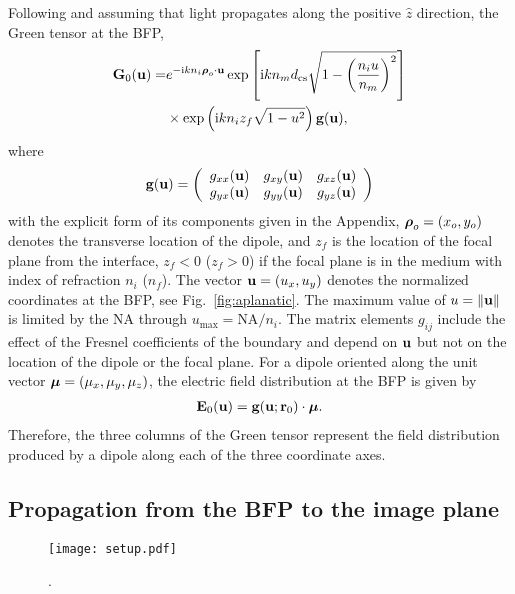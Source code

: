 \documentclass[reprint,aps,pra,superscriptaddress,
amsmath,amssymb]{revtex4-1}
\begin{document}
Following \cite{lieb2004single,novotny2006principles} and assuming that 
light propagates along the positive $\hat z$ direction, the Green tensor 
at the BFP,
\begin{align} \label{eq:G0}
\textbf G_0 (\textbf u) = &   e^{-\text{i} k n_i \boldsymbol \rho_o \cdot \textbf u } 
\exp \left[\text{i} k n_m d_\text{cs} 
\sqrt{1 - \left(\frac{n_i u}{n_m} \right)^2 } \right]  \nonumber \\
& \times \exp \left(\text{i} k n_i z_f \sqrt{1 - u^2} \right) \textbf g (\textbf u) ,
\end{align}
where 
\begin{align}
\textbf g (\textbf u) =
\left(
\begin{array}{ccc}
g_{xx}  (\textbf u)& g_{xy}  (\textbf u)& g_{xz}  (\textbf u) \\
g_{yx}  (\textbf u)& g_{yy}  (\textbf u)& g_{yz} (\textbf u)
\end{array}
\right)
\end{align}
with the explicit form of  its components given in the Appendix,
$\boldsymbol \rho_o =(x_o,y_o)$  denotes the transverse location of the dipole, 
and 
$z_f$ is the location of the focal plane from the interface, $z_f<0$ 
($z_f>0$) if the focal plane is in the medium with index of refraction 
$n_i$ ($n_f$). The vector 
$\textbf u = (u_x, u_y)$ denotes the normalized coordinates at the BFP, 
see Fig.~\ref{fig:aplanatic}. The maximum value of $u = \left\lVert\textbf u\right\rVert$ is 
limited by the NA through $u_\text{max} = \text{NA}/n_i$. 
The matrix elements $g_{ij}$ include the effect of the Fresnel coefficients 
of the boundary and depend on $\textbf u$ but not on the location of the dipole 
or the focal plane.  For a dipole oriented along the unit vector 
$\boldsymbol \mu = (\mu_x, \mu_y, \mu_z)$, the electric field distribution at the BFP 
is given by 
\begin{align}
\textbf E_{0} (\textbf u) = \textbf g (\textbf u; \textbf r_0) \cdot \boldsymbol \mu.
\end{align}
Therefore, the three columns of the Green tensor represent the field 
distribution produced by a dipole along each of the three coordinate axes. 


\subsection{Propagation from the BFP to the image plane}

\begin{figure}
\centering
\texttt{[image: setup.pdf]}
\caption{\label{fig:setup} . }
\end{figure}
\end{document}
